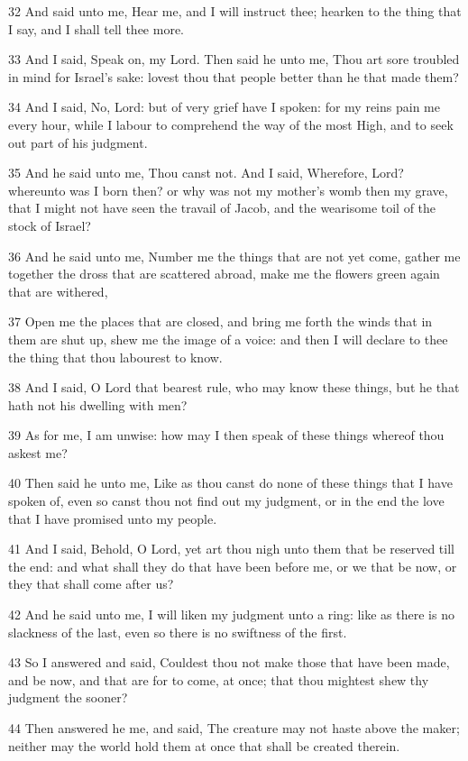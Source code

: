 \par 32 And said unto me, Hear me, and I will instruct thee; hearken to the thing that I say, and I shall tell thee more.
\par 33 And I said, Speak on, my Lord. Then said he unto me, Thou art sore troubled in mind for Israel's sake: lovest thou that people better than he that made them?
\par 34 And I said, No, Lord: but of very grief have I spoken: for my reins pain me every hour, while I labour to comprehend the way of the most High, and to seek out part of his judgment.
\par 35 And he said unto me, Thou canst not. And I said, Wherefore, Lord? whereunto was I born then? or why was not my mother's womb then my grave, that I might not have seen the travail of Jacob, and the wearisome toil of the stock of Israel?
\par 36 And he said unto me, Number me the things that are not yet come, gather me together the dross that are scattered abroad, make me the flowers green again that are withered,
\par 37 Open me the places that are closed, and bring me forth the winds that in them are shut up, shew me the image of a voice: and then I will declare to thee the thing that thou labourest to know.
\par 38 And I said, O Lord that bearest rule, who may know these things, but he that hath not his dwelling with men?
\par 39 As for me, I am unwise: how may I then speak of these things whereof thou askest me?
\par 40 Then said he unto me, Like as thou canst do none of these things that I have spoken of, even so canst thou not find out my judgment, or in the end the love that I have promised unto my people.
\par 41 And I said, Behold, O Lord, yet art thou nigh unto them that be reserved till the end: and what shall they do that have been before me, or we that be now, or they that shall come after us?
\par 42 And he said unto me, I will liken my judgment unto a ring: like as there is no slackness of the last, even so there is no swiftness of the first.
\par 43 So I answered and said, Couldest thou not make those that have been made, and be now, and that are for to come, at once; that thou mightest shew thy judgment the sooner?
\par 44 Then answered he me, and said, The creature may not haste above the maker; neither may the world hold them at once that shall be created therein.

